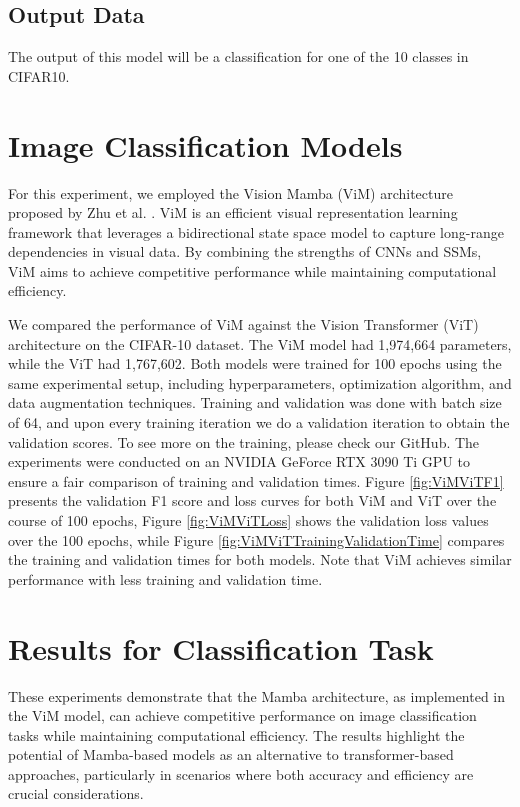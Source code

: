 \documentclass[conference]{IEEEtran}
\begin{document}
\subsection{Output Data}
The output of this model will be a classification for one of the 10 classes in CIFAR10.



\section{Image Classification Models}

For this experiment, we employed the Vision Mamba (ViM) architecture proposed by Zhu et al. \cite{zhu2024vision}. ViM is an efficient visual representation learning framework that leverages a bidirectional state space model to capture long-range dependencies in visual data. By combining the strengths of CNNs and SSMs, ViM aims to achieve competitive performance while maintaining computational efficiency.

We compared the performance of ViM against the Vision Transformer (ViT) architecture \cite{dosovitskiy2021image} on the CIFAR-10 dataset. The ViM model had 1,974,664 parameters, while the ViT had 1,767,602.
Both models were trained for 100 epochs using the same experimental setup, including hyperparameters, optimization algorithm, and data augmentation techniques. Training and validation was done with batch size of 64, and upon every training iteration we do a validation iteration to obtain the validation scores. To see more on the training, please check our GitHub. The experiments were conducted on an NVIDIA GeForce RTX 3090 Ti GPU to ensure a fair comparison of training and validation times.
Figure \ref{fig:ViMViTF1} presents the validation F1 score and loss curves for both ViM and ViT over the course of 100 epochs, Figure \ref{fig:ViMViTLoss} shows the validation loss values over the 100 epochs, while Figure \ref{fig:ViMViTTrainingValidationTime} compares the training and validation times for both models. Note that ViM achieves similar performance with less training and validation time.


\section{Results for Classification Task}

These experiments demonstrate that the Mamba architecture, as implemented in the ViM model, can achieve competitive performance on image classification tasks while maintaining computational efficiency. The results highlight the potential of Mamba-based models as an alternative to transformer-based approaches, particularly in scenarios where both accuracy and efficiency are crucial considerations.
\end{document}
